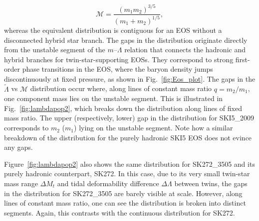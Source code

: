 \documentclass[aps,prl,twocolumn,superscriptaddress,footinbib]{revtex4-1}
\begin{document}
\begin{equation}
    \mathcal{M} = \frac{(m_1 m_2)^{3/5}}{(m_1+m_2)^{1/5}} ,
\end{equation}
whereas the equivalent distribution is contiguous for an EOS without a disconnected hybrid star branch.
The gaps in the distribution originate directly from the unstable segment of the $m$--$\Lambda$ relation that connects the hadronic and hybrid branches for twin-star-supporting EOSs.
They correspond to strong first-order phase transitions in the EOS, where the baryon density jumps discontinuously at fixed pressure, as shown in Fig.~\ref{fig:Eos_plot}.
The gaps in the $\tilde{\Lambda}$ vs $\mathcal{M}$ distribution occur where, along lines of constant mass ratio $q = m_2/m_1$, one component mass lies on the unstable segment.
This is illustrated in Fig.~\ref{fig:lambdapop2}, which breaks down the distribution along lines of fixed mass ratio.
The upper (respectively, lower) gap in the distribution for SKI5\_2009 corresponds to $m_2$ ($m_1$) lying on the unstable segment. Note how a similar breakdown of the distribution for the purely hadronic SKI5 EOS does not evince any gaps.

Figure~\ref{fig:lambdapop2} also shows the same distribution for SK272\_3505 and its purely hadronic counterpart, SK272. In this case, due to its very small twin-star mass range $\Delta M_t$ and tidal deformability difference $\Delta\Lambda$ between twins, the gaps in the distribution for SK272\_3505 are barely visible at scale. However, along lines of constant mass ratio, one can see the distribution is broken into distinct segments. Again, this contrasts with the continuous distribution for SK272.
\end{document}
